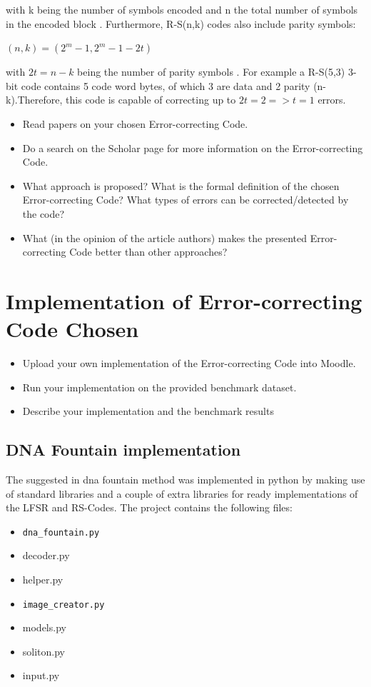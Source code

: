 \documentclass[12pt]%
{article}
\begin{document}
with k being the number of symbols encoded and n the total number of symbols in the encoded block \cite{sklar2001reed}. Furthermore, R-S(n,k) codes also include parity symbols:

\begin{center}

$(n,k)=(2^m - 1, 2^m -1 - 2t)$

\end{center}

with $2t = n - k$ being the number of parity symbols \cite{sklar2001reed}. For example a R-S(5,3) 3-bit code  contains 5 code word bytes, of which 3 are data and 2 parity (n-k).Therefore, this code is capable of correcting up to $2t=2   => t = 1$ errors.

\begin{itemize}
\item Read papers on your chosen  Error-correcting Code.
\item Do a search on the Scholar page for more information on the Error-correcting Code.
\item What approach is proposed? What is the formal definition of the chosen Error-correcting Code? What types of errors can be corrected/detected by the code? 
\item What (in the opinion of the article authors) makes the presented Error-correcting Code better than other approaches? 
\end{itemize}

\section{Implementation of  Error-correcting Code Chosen}

\begin{itemize}
\item Upload your own implementation of the  Error-correcting Code into Moodle.
\item Run your implementation on the provided benchmark dataset.
\item Describe your implementation and the benchmark results
\end{itemize}

\subsection{DNA Fountain implementation}

The suggested in \cite{erlich2017dna} dna fountain method was implemented in python by making use of standard libraries and a couple of extra libraries for ready implementations of the LFSR and RS-Codes. The project contains the following files:
\begin{itemize}
\item \texttt{dna\_fountain.py}
\item decoder.py
\item helper.py
\item \texttt{image\_creator.py}
\item models.py
\item soliton.py
\item input.py
\end{itemize}
\end{document}

